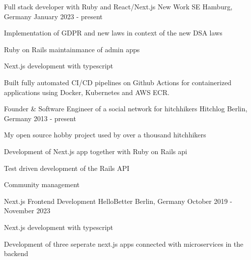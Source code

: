 

\begin{cventries}
  \cventry
    {Full stack developer with Ruby and React/Next.js} %
    {New Work SE} %
    {Hamburg, Germany} %
    {January 2023 - present} %
    {
      \begin{cvitems} %
        \item {Implementation of GDPR and new laws in context of the new DSA laws}
        \item {Ruby on Rails maintainmance of admin apps}
        \item {Next.js development with typescript}
        \item {Built fully automated CI/CD pipelines on Github Actions for containerized applications using Docker, Kubernetes and AWS ECR.}
      \end{cvitems}
    }

  \cventry
    {Founder \& Software Engineer of a social network for hitchhikers} %
    {Hitchlog} %
    {Berlin, Germany} %
    {2013 - present} %
    {
      \begin{cvitems} %
        \item {My open source hobby project used by over a thousand hitchhikers}
        \item {Development of Next.js app together with Ruby on Rails api}
        \item {Test driven development of the Rails API}
        \item {Community management}
      \end{cvitems}
    }

  \cventry
    {Next.js Frontend Development} %
    {HelloBetter} %
    {Berlin, Germany} %
    {October 2019 - November 2023} %
    {
      \begin{cvitems} %
        \item {Next.js development with typescript}
        \item {Development of three seperate next.js apps connected with microservices in the backend}
      \end{cvitems}
    }


\end{cventries}
